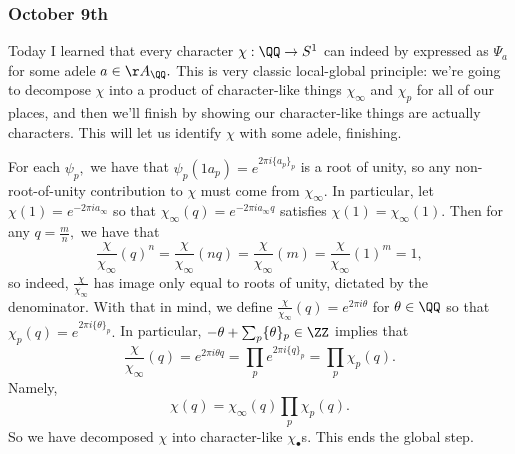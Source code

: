 \subsubsection{October 9th}
Today I learned that every character $\chi:\QQ\to S^1$ can indeed by expressed as $\Psi_a$ for some adele $a\in\AA_\QQ.$ This is very classic local-global principle: we're going to decompose $\chi$ into a product of character-like things $\chi_\infty$ and $\chi_p$ for all of our places, and then we'll finish by showing our character-like things are actually characters. This will let us identify $\chi$ with some adele, finishing.

For each $\psi_p,$ we have that $\psi_p(1a_p)=e^{2\pi i\{a_p\}_p}$ is a root of unity, so any non-root-of-unity contribution to $\chi$ must come from $\chi_\infty.$ In particular, let $\chi(1)=e^{-2\pi ia_\infty}$ so that $\chi_\infty(q)=e^{-2\pi ia_\infty q}$ satisfies $\chi(1)=\chi_\infty(1).$ Then for any $q=\frac mn,$ we have that
\[\frac\chi{\chi_\infty}(q)^n=\frac\chi{\chi_\infty}(nq)=\frac\chi{\chi_\infty}(m)=\frac\chi{\chi_\infty}(1)^m=1,\]
so indeed, $\frac\chi{\chi_\infty}$ has image only equal to roots of unity, dictated by the denominator. With that in mind, we define $\frac\chi{\chi_\infty}(q)=e^{2\pi i\theta}$ for $\theta\in\QQ$ so that $\chi_p(q)=e^{2\pi i\{\theta\}_p}.$ In particular, $-\theta+\sum_p\{\theta\}_p\in\ZZ$ implies that
\[\frac\chi{\chi_\infty}(q)=e^{2\pi i\theta q}=\prod_pe^{2\pi i\{q\}_p}=\prod_p\chi_p(q).\]
Namely,
\[\chi(q)=\chi_\infty(q)\prod_p\chi_p(q).\]
So we have decomposed $\chi$ into character-like $\chi_\bullet$s. This ends the global step.

